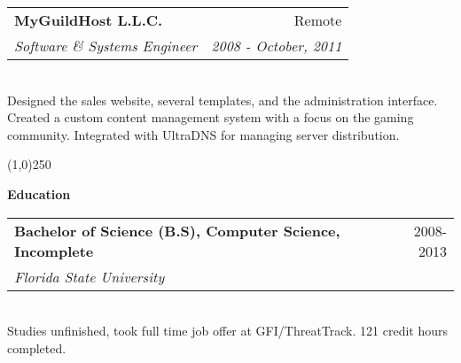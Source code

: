 \documentclass[a4paper,11pt,sans]{article}
\makeatletter
\newcommand{\resheading}[1]{{\large \colorbox{myblue}{\begin{minipage}{\textwidth}{\textbf{#1 \vphantom{p\^{E}}}}\end{minipage}}}}
\newcommand{\ressubheading}[4]{
\begin{tabular*}{7.0in}{l@{\extracolsep{\fill}}r}
		\textbf{#1} & #2 \\
		\textit{#3} & \textit{#4} \\
\end{tabular*}\vspace{-6pt}}
\makeatother
\begin{document}
\ressubheading{MyGuildHost L.L.C.}{Remote}{Software \& Systems Engineer}{2008 - October, 2011}

\hspace{5pt} \\

Designed the sales website, several templates, and the administration interface.
Created a custom content management system with a focus on the gaming community.
Integrated with UltraDNS for managing server distribution.

\begin{center}
  \line(1,0){250}
\end{center}

\resheading{\color{white} Education}

\ressubheading{Bachelor of Science (B.S), Computer Science, Incomplete}{2008-2013}{Florida State University}{}

\hspace{5pt} \\

Studies unfinished, took full time job offer at GFI/ThreatTrack. 121 credit hours completed. 
\end{document}
